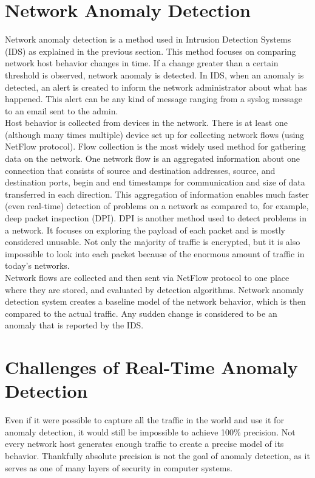 \documentclass[thesis=B,english]{FITthesis}[2012/10/20]
\begin{document}
\section{Network Anomaly Detection}\label{sec:nbad}
Network anomaly detection is a method used in Intrusion Detection Systems (IDS) as explained in the previous section.
This method focuses on comparing network host behavior changes in time.
If a change greater than a certain threshold is observed, network anomaly is detected.
In IDS, when an anomaly is detected, an alert is created to inform the network administrator about what has happened.
This alert can be any kind of message ranging from a syslog message to an email sent to the admin. \\

Host behavior is collected from devices in the network.
There is at least one (although many times multiple) device set up for collecting network flows (using NetFlow protocol).
Flow collection is the most widely used method for gathering data on the network.
One network flow is an aggregated information about one connection that consists of source and destination addresses, source, and destination ports, begin and end timestamps for communication and size of data transferred in each direction.
This aggregation of information enables much faster (even real-time) detection of problems on a network as compared to, for example, deep packet inspection (DPI).
DPI is another method used to detect problems in a network.
It focuses on exploring the payload of each packet and is mostly considered unusable.
Not only the majority of traffic is encrypted, but it is also impossible to look into each packet because of the enormous amount of traffic in today's networks. \\

Network flows are collected and then sent via NetFlow protocol to one place where they are stored, and evaluated by detection algorithms.
Network anomaly detection system creates a baseline model of the network behavior, which is then compared to the actual traffic.
Any sudden change is considered to be an anomaly that is reported by the IDS. \\

\section{Challenges of Real-Time Anomaly Detection}\label{sec:challenges}
Even if it were possible to capture all the traffic in the world and use it for anomaly detection, it would still be impossible to achieve 100\% precision.
Not every network host generates enough traffic to create a precise model of its behavior.
Thankfully absolute precision is not the goal of anomaly detection, as it serves as one of many layers of security in computer systems. \\
\end{document}
